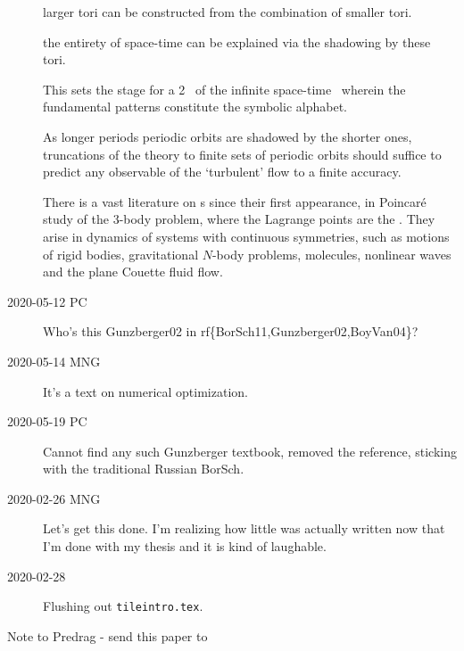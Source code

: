 \begin{description}
larger tori can be constructed from the combination of smaller tori.

the entirety of space-time
can be explained via the shadowing by these tori.


This sets the stage for a 2\dmn\ {\symbolic}
of the infinite space-time \KSe\ wherein the fundamental
patterns constitute the symbolic alphabet.


As longer periods periodic
orbits are shadowed by the shorter ones, truncations of the theory to
finite sets of periodic orbits should suffice to predict any observable
of the `turbulent' flow to a finite accuracy.

There is a vast
literature on {\rpo s} since their first appearance, in
Poincar\'e study of the 3-body problem,
where the Lagrange points are the \reqva.  They arise in
dynamics of systems with continuous symmetries, such as
motions of rigid bodies, gravitational $N$-body problems,
molecules, nonlinear waves  and the plane Couette fluid flow.

\item[2020-05-12 PC] Who's this Gunzberger02 in
 rf\{BorSch11,Gunzberger02,BoyVan04\}?
\item[2020-05-14 MNG] It's a text on numerical optimization.
\item[2020-05-19 PC]
Cannot find any such Gunzberger textbook, removed the reference,
sticking with the traditional Russian BorSch.

\item[2020-02-26 MNG] Let's get this done.
I'm realizing how little was actually written now that I'm done with my thesis and it is kind of laughable.

\item[2020-02-28] Flushing out \texttt{tileintro.tex}. 

\end{description}




\bigskip
Note to Predrag - send this paper to
